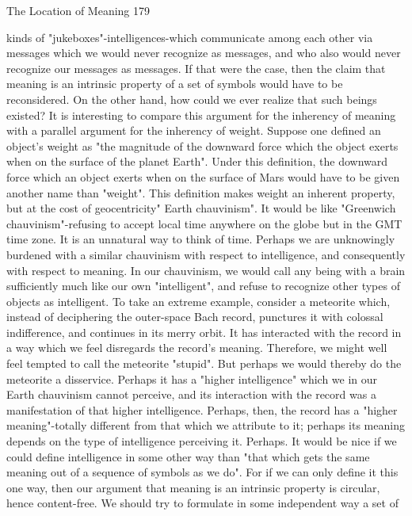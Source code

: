 The Location of Meaning                                                                     179

kinds of "jukeboxes"-intelligences-which communicate among each other via messages
which we would never recognize as messages, and who also would never recognize our
messages as messages. If that were the case, then the claim that meaning is an intrinsic
property of a set of symbols would have to be reconsidered. On the other hand, how
could we ever realize that such beings existed?
        It is interesting to compare this argument for the inherency of meaning with a
parallel argument for the inherency of weight. Suppose one defined an object's weight as
"the magnitude of the downward force which the object exerts when on the surface of the
planet Earth". Under this definition, the downward force which an object exerts when on
the surface of Mars would have to be given another name than "weight". This definition
makes weight an inherent property, but at the cost of geocentricity" Earth chauvinism". It
would be like "Greenwich chauvinism"-refusing to accept local time anywhere on the
globe but in the GMT time zone. It is an unnatural way to think of time.
        Perhaps we are unknowingly burdened with a similar chauvinism with respect to
intelligence, and consequently with respect to meaning. In our chauvinism, we would call
any being with a brain sufficiently much like our own "intelligent", and refuse to
recognize other types of objects as intelligent. To take an extreme example, consider a
meteorite which, instead of deciphering the outer-space Bach record, punctures it with
colossal indifference, and continues in its merry orbit. It has interacted with the record in
a way which we feel disregards the record's meaning. Therefore, we might well feel
tempted to call the meteorite "stupid". But perhaps we would thereby do the meteorite a
disservice. Perhaps it has a "higher intelligence" which we in our Earth chauvinism
cannot perceive, and its interaction with the record was a manifestation of that higher
intelligence. Perhaps, then, the record has a "higher meaning"-totally different from that
which we attribute to it; perhaps its meaning depends on the type of intelligence
perceiving it. Perhaps.
        It would be nice if we could define intelligence in some other way than "that
which gets the same meaning out of a sequence of symbols as we do". For if we can only
define it this one way, then our argument that meaning is an intrinsic property is circular,
hence content-free. We should try to formulate in some independent way a set of
